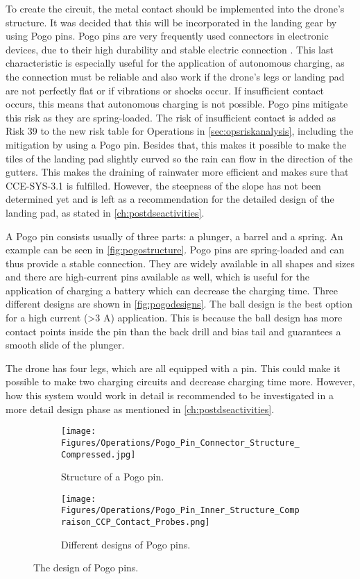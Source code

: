 To create the circuit, the metal contact should be implemented into the drone's structure. It was decided that this will be incorporated in the landing gear by using Pogo pins. Pogo pins are very frequently used connectors in electronic devices, due to their high durability and stable electric connection \cite{pogopin}. This last characteristic is especially useful for the application of autonomous charging, as the connection must be reliable and also work if the drone's legs or landing pad are not perfectly flat or if vibrations or shocks occur. If insufficient contact occurs, this means that autonomous charging is not possible. Pogo pins mitigate this risk as they are spring-loaded. The risk of insufficient contact is added as Risk 39 to the new risk table for Operations in \autoref{sec:opsriskanalysis}, including the mitigation by using a Pogo pin.
Besides that, this makes it possible to make the tiles of the landing pad slightly curved so the rain can flow in the direction of the gutters. This makes the draining of rainwater more efficient and makes sure that CCE-SYS-3.1\label{req:CCE-SYS-3.1} is fulfilled. However, the steepness of the slope has not been determined yet and is left as a recommendation for the detailed design of the landing pad, as stated in \autoref{ch:postdseactivities}.

A Pogo pin consists usually of three parts: a plunger, a barrel and a spring. An example can be seen in \autoref{fig:pogostructure}. Pogo pins are spring-loaded and can thus provide a stable connection. They are widely available in all shapes and sizes and there are high-current pins available as well, which is useful for the application of charging a battery which can decrease the charging time. Three different designs are shown in \autoref{fig:pogodesigns}. The ball design is the best option for a high current (>3 A) application. This is because the ball design has more contact points inside the pin than the back drill and bias tail and guarantees a smooth slide of the plunger. \cite{pogopin}

The drone has four legs, which are all equipped with a pin. This could make it possible to make two charging circuits and decrease charging time more. However, how this system would work in detail is recommended to be investigated in a more detail design phase as mentioned in \autoref{ch:postdseactivities}.

\begin{figure}
    \centering
    \begin{subfigure}{0.48\textwidth}
    \texttt{[image: Figures/Operations/Pogo\_Pin\_Connector\_Structure\_Compressed.jpg]}
    \caption{Structure of a Pogo pin.}
    \label{fig:pogostructure}

    \end{subfigure}
\begin{subfigure}{0.48\textwidth}
    \centering
    \texttt{[image: Figures/Operations/Pogo\_Pin\_Inner\_Structure\_Compraison\_CCP\_Contact\_Probes.png]}
    \caption{Different designs of Pogo pins. }
    \label{fig:pogodesigns}
    \end{subfigure}
    \caption{The design of Pogo pins.\cite{pogopin}}
\end{figure}

